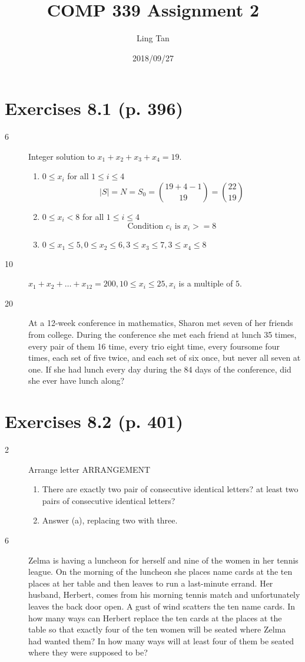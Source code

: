 \documentclass[a4paper]{article}
\title{COMP 339 Assignment 2}
\author{Ling Tan}
\date{2018/09/27}
\begin{document}
\maketitle

\section*{Exercises 8.1 (p. 396)}
\begin{description}
\item[6] Integer solution to $x_1+x_2+x_3+x_4=19$.
\begin{enumerate}[label=\alph*)]
    \item $0\leq x_i$ for all $1\leq i\leq 4$\\
    $$|S| = N =S_0=\binom{19+4-1}{19}=\binom{22}{19}$$
    \item $0\leq x_i < 8$ for all $1\leq i\leq 4$\\
    $$\text{Condition }c_i\text{ is }x_i>=8$$
    \item $0\leq x_1 \leq 5, 0\leq x_2 \leq 6, 3\leq x_3 \leq 7, 3\leq x_4 \leq 8$
\end{enumerate}
\item[10] $x_1+x_2+\dots+x_{12}=200,10\leq x_i\leq25,x_i$ is a multiple of $5$.
\item[20] At a 12-week conference in mathematics, Sharon met seven of her friends from college. During the conference she met each friend at lunch 35 times, every pair of them 16 time, every trio eight time, every foursome four times, each set of five twice, and each set of six once, but never all seven at one. If she had lunch every day during the 84 days of the conference, did she ever have lunch along?
\end{description}

\section*{Exercises 8.2 (p. 401)}
\begin{description}
\item[2] Arrange letter ARRANGEMENT
\begin{enumerate}[label=\alph*)]
    \item There are exactly two pair of consecutive identical letters? at least two pairs of consecutive identical letters?
    \item Answer (a), replacing two with three.
\end{enumerate}
\item[6] Zelma is having a luncheon for herself and nine of the women in her tennis league. On the morning of the luncheon she places name cards at the ten places at her table and then leaves to run a last-minute errand. Her husband, Herbert, comes from his morning tennis match and unfortunately leaves the back door open. A gust of wind scatters the ten name cards. In how many ways can Herbert replace the ten cards at the places at the table so that exactly four of the ten women will be seated where Zelma had wanted them? In how many ways will at least four of them be seated where they were supposed to be?
\end{description}
\end{document}
